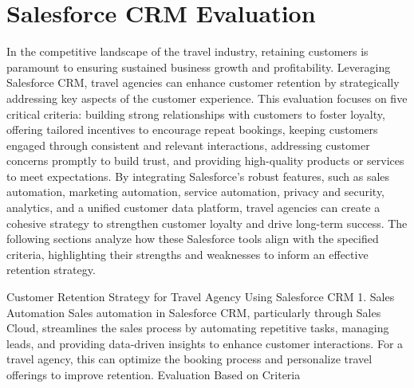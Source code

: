 \section{Salesforce CRM Evaluation}

In the competitive landscape of the travel industry, retaining customers is paramount to ensuring sustained business growth and profitability. Leveraging Salesforce CRM, travel agencies can enhance customer retention by strategically addressing key aspects of the customer experience. This evaluation focuses on five critical criteria: building strong relationships with customers to foster loyalty, offering tailored incentives to encourage repeat bookings, keeping customers engaged through consistent and relevant interactions, addressing customer concerns promptly to build trust, and providing high-quality products or services to meet expectations. By integrating Salesforce's robust features, such as sales automation, marketing automation, service automation, privacy and security, analytics, and a unified customer data platform, travel agencies can create a cohesive strategy to strengthen customer loyalty and drive long-term success. The following sections analyze how these Salesforce tools align with the specified criteria, highlighting their strengths and weaknesses to inform an effective retention strategy.


Customer Retention Strategy for Travel Agency Using Salesforce CRM
1. Sales Automation
Sales automation in Salesforce CRM, particularly through Sales Cloud, streamlines the sales process by automating repetitive tasks, managing leads, and providing data-driven insights to enhance customer interactions. For a travel agency, this can optimize the booking process and personalize travel offerings to improve retention.
Evaluation Based on Criteria

